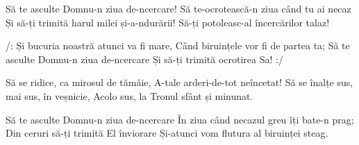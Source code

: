 \beginverse
Să te asculte Domnu-n ziua de-ncercare!
Să te-ocrotească-n ziua când tu ai necaz
Și să-ți trimită harul milei și-a-ndurării!
Să-ți potoleasc-al încercărilor talaz!
\endverse

\beginchorus
/: Și bucuria noastră atunci va fi mare,
Când biruințele vor fi de partea ta;
Să te asculte Domnu-n ziua de-ncercare
Și să-ți trimită ocrotirea Sa! :/
\endchorus

\beginverse
Să se ridice, ca mirosul de tămâie,
A-tale arderi-de-tot neîncetat!
Să se înalțe sus, mai sus, în veșnicie,
Acolo sus, la Tronul sfânt și minunat.
\endverse

\beginverse
Să te asculte Domnu-n ziua de-ncercare
În ziua când necazul greu îți bate-n prag;
Din ceruri să-ți trimită El înviorare
Și-atunci vom flutura al biruinței steag.
\endverse
\endsong
